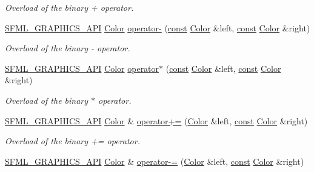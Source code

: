 \begin{DoxyCompactItemize}
\begin{DoxyCompactList}\small\item\em Overload of the binary + operator. \end{DoxyCompactList}\item 
\hyperlink{sfml_2dep_2_s_f_m_l-2_84_82_2include_2_s_f_m_l_2_graphics_2_export_8hpp_ab84c9f1035e146917de3bc0f98d72b35}{S\-F\-M\-L\-\_\-\-G\-R\-A\-P\-H\-I\-C\-S\-\_\-\-A\-P\-I} \hyperlink{classsf_1_1_color}{Color} \hyperlink{classsf_1_1_color_a6d9047ddbcec2bbab8519d93300bb2aa}{operator-\/} (\hyperlink{term__entry_8h_a57bd63ce7f9a353488880e3de6692d5a}{const} \hyperlink{classsf_1_1_color}{Color} \&left, \hyperlink{term__entry_8h_a57bd63ce7f9a353488880e3de6692d5a}{const} \hyperlink{classsf_1_1_color}{Color} \&right)
\begin{DoxyCompactList}\small\item\em Overload of the binary -\/ operator. \end{DoxyCompactList}\item 
\hyperlink{sfml_2dep_2_s_f_m_l-2_84_82_2include_2_s_f_m_l_2_graphics_2_export_8hpp_ab84c9f1035e146917de3bc0f98d72b35}{S\-F\-M\-L\-\_\-\-G\-R\-A\-P\-H\-I\-C\-S\-\_\-\-A\-P\-I} \hyperlink{classsf_1_1_color}{Color} \hyperlink{classsf_1_1_color_aa9de267d831b4ec8ba65b627e51d50c3}{operator$\ast$} (\hyperlink{term__entry_8h_a57bd63ce7f9a353488880e3de6692d5a}{const} \hyperlink{classsf_1_1_color}{Color} \&left, \hyperlink{term__entry_8h_a57bd63ce7f9a353488880e3de6692d5a}{const} \hyperlink{classsf_1_1_color}{Color} \&right)
\begin{DoxyCompactList}\small\item\em Overload of the binary $\ast$ operator. \end{DoxyCompactList}\item 
\hyperlink{sfml_2dep_2_s_f_m_l-2_84_82_2include_2_s_f_m_l_2_graphics_2_export_8hpp_ab84c9f1035e146917de3bc0f98d72b35}{S\-F\-M\-L\-\_\-\-G\-R\-A\-P\-H\-I\-C\-S\-\_\-\-A\-P\-I} \hyperlink{classsf_1_1_color}{Color} \& \hyperlink{classsf_1_1_color_a19917f2453a4acfd69de2539bfab8031}{operator+=} (\hyperlink{classsf_1_1_color}{Color} \&left, \hyperlink{term__entry_8h_a57bd63ce7f9a353488880e3de6692d5a}{const} \hyperlink{classsf_1_1_color}{Color} \&right)
\begin{DoxyCompactList}\small\item\em Overload of the binary += operator. \end{DoxyCompactList}\item 
\hyperlink{sfml_2dep_2_s_f_m_l-2_84_82_2include_2_s_f_m_l_2_graphics_2_export_8hpp_ab84c9f1035e146917de3bc0f98d72b35}{S\-F\-M\-L\-\_\-\-G\-R\-A\-P\-H\-I\-C\-S\-\_\-\-A\-P\-I} \hyperlink{classsf_1_1_color}{Color} \& \hyperlink{classsf_1_1_color_a86ceee6b959136932020db4036918ecd}{operator-\/=} (\hyperlink{classsf_1_1_color}{Color} \&left, \hyperlink{term__entry_8h_a57bd63ce7f9a353488880e3de6692d5a}{const} \hyperlink{classsf_1_1_color}{Color} \&right)

\end{DoxyCompactItemize}
